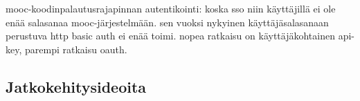 \documentclass[finnish,gradu]{tktltiki}
\begin{document}
  mooc-koodinpalautusrajapinnan autentikointi: koska sso niin käyttäjillä ei ole enää salasanaa mooc-järjestelmään. sen vuoksi nykyinen käyttäjäsalasanaan perustuva http basic auth ei enää toimi. nopea ratkaisu on käyttäjäkohtainen api-key, parempi ratkaisu oauth.







  \subsection{Jatkokehitysideoita} %
  \label{sub:jatkokehitysideoita}
\end{document}
